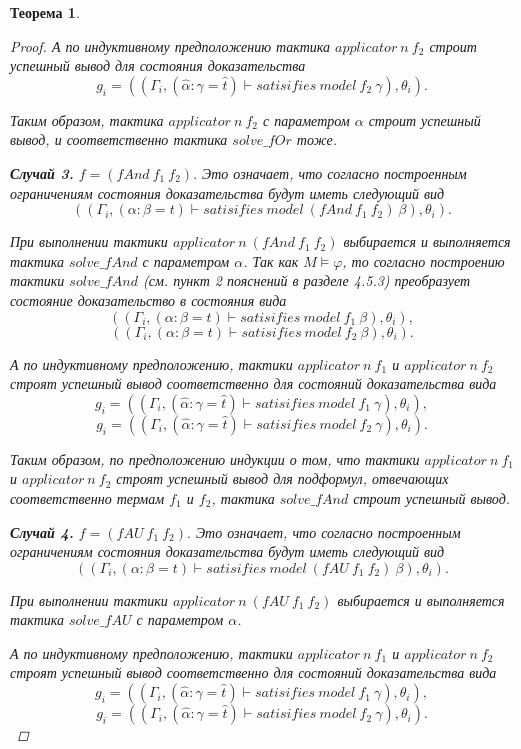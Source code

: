 \documentclass[12pt]{article}
\newtheorem{theorem}{Теорема}
\begin{document}
\begin{theorem}
\begin{proof}
А по индуктивному предположению тактика $applicator\ n\ f_2$
строит успешный вывод для состояния доказательства
$$g_i = ((\Gamma_i, (\hat{\alpha}: \gamma=\hat{t}) \vdash satisifies\ model\ f_2\ \gamma), \theta_i).$$

Таким образом, тактика $applicator\ n\ f_2$ с параметром $\alpha$ строит успешный вывод, и соответственно тактика $solve\_fOr$ тоже.


\textbf{Случай 3.} $f=(fAnd\ f_1\ f_2).$
Это означает, что согласно построенным ограничениям состояния доказательства будут иметь следующий вид 
$$((\Gamma_i, (\alpha: \beta=t) \vdash satisifies\ model\ (fAnd\ f_1\ f_2)\ \beta), \theta_i).$$


При выполнении тактики $applicator\ n\ (fAnd\ f_1\ f_2)$ выбирается и выполняется тактика $solve\_fAnd$ с параметром $\alpha$.
Так как $M \models \varphi$, то
согласно построению тактики $solve\_fAnd$ (см. пункт 2 пояснений в разделе 4.5.3) преобразует состояние доказательство в состояния вида
$$((\Gamma_i, (\alpha: \beta=t) \vdash satisifies\ model\ f_1\ \beta), \theta_i),$$
$$((\Gamma_i, (\alpha: \beta=t) \vdash satisifies\ model\ f_2\ \beta), \theta_i).$$


А по индуктивному предположению, тактики $applicator\ n\ f_1$ и $applicator\ n\ f_2$ строят успешный вывод соответственно для состояний доказательства вида
$$g_i = ((\Gamma_i, (\hat{\alpha}: \gamma=\hat{t}) \vdash satisifies\ model\ f_1\ \gamma), \theta_i),$$
$$g_i = ((\Gamma_i, (\hat{\alpha}: \gamma=\hat{t}) \vdash satisifies\ model\ f_2\ \gamma), \theta_i).$$

Таким образом, по предположению индукции о том, что тактики $applicator\ n\ f_1$ и $applicator\ n\ f_2$ строят успешный вывод для подформул, отвечающих соответственно термам $f_1$ и $f_2$, тактика $solve\_fAnd$ строит успешный вывод.

\textbf{Случай 4.} $f=(fAU\ f_1\ f_2).$
Это означает, что согласно построенным ограничениям состояния доказательства будут иметь следующий вид 
$$((\Gamma_i, (\alpha: \beta=t) \vdash satisifies\ model\ (fAU\ f_1\ f_2) \ \beta), \theta_i).$$

При выполнении тактики $applicator\ n\ (fAU\ f_1\ f_2)$ выбирается и выполняется тактика $solve\_fAU$ с параметром $\alpha$.

А по индуктивному предположению, тактики $applicator\ n\ f_1$ и $applicator\ n\ f_2$ строят успешный вывод соответственно для состояний доказательства вида
$$g_i = ((\Gamma_i, (\hat{\alpha}: \gamma=\hat{t}) \vdash satisifies\ model\ f_1\ \gamma), \theta_i),$$
$$g_i = ((\Gamma_i, (\hat{\alpha}: \gamma=\hat{t}) \vdash satisifies\ model\ f_2\ \gamma), \theta_i).$$



\end{proof}
\end{theorem}
\end{document}
